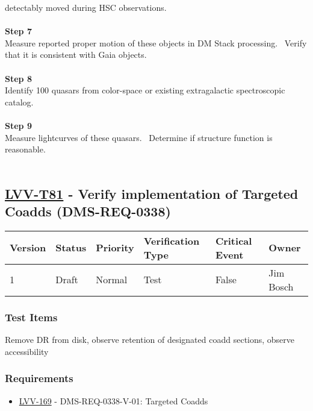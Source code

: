 detectably moved during HSC observations.\\
~\\
\textbf{Step 7}\\
Measure reported proper motion of these objects in DM Stack processing.
~Verify that it is consistent with Gaia objects.\\
~\\
\textbf{Step 8}\\
Identify 100 quasars from color-space or existing extragalactic
spectroscopic catalog.\\
~\\
\textbf{Step 9}\\
Measure lightcurves of these quasars. ~Determine if structure function
is reasonable.\\
~\\

\hypertarget{lvv-t81---verify-implementation-of-targeted-coadds-dms-req-0338}{%
\subsection{\texorpdfstring{\href{https://jira.lsstcorp.org/secure/Tests.jspa\#/testCase/LVV-T81}{LVV-T81}
- Verify implementation of Targeted Coadds
(DMS-REQ-0338)}{LVV-T81 - Verify implementation of Targeted Coadds (DMS-REQ-0338)}}\label{lvv-t81---verify-implementation-of-targeted-coadds-dms-req-0338}}

\begin{longtable}[]{@{}llllll@{}}
\toprule
Version & Status & Priority & Verification Type & Critical Event &
Owner\tabularnewline
\midrule
\endhead
1 & Draft & Normal & Test & False & Jim Bosch\tabularnewline
\bottomrule
\end{longtable}

\hypertarget{test-items-170}{%
\subsubsection{Test Items}\label{test-items-170}}

​​​​Remove DR from disk, observe retention of designated coadd sections,
observe accessibility

\hypertarget{requirements-171}{%
\subsubsection{Requirements}\label{requirements-171}}

\begin{itemize}
\tightlist
\item
  \href{https://jira.lsstcorp.org/browse/LVV-169}{LVV-169} -
  DMS-REQ-0338-V-01: Targeted Coadds
\end{itemize}

